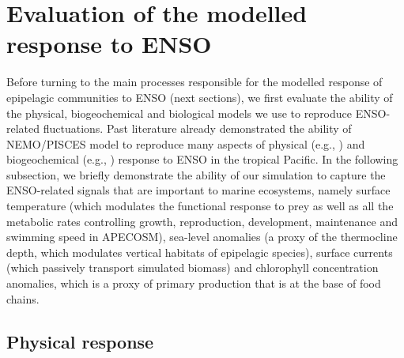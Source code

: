 \section{Evaluation of the modelled response to ENSO}
\label{sec:model-val}

Before turning to the main processes responsible for the modelled response of epipelagic communities to ENSO (next sections), we first evaluate the ability of the physical, biogeochemical and biological models we use to reproduce ENSO-related fluctuations. Past literature already demonstrated the ability of NEMO/PISCES model to reproduce many aspects of physical (e.g., \citealt{vialardModelStudyOceanic2001, lengaigneMechanismsControllingWarm2012, drushkaProcessesDrivingIntraseasonal2015, puyModulationEquatorialPacific2019}) and biogeochemical (e.g., \citealt{ masottiLargescaleShiftsPhytoplankton2011,gorguesRevisitingNina19982010, martinezReconstructingGlobalChlorophylla2020}) response to ENSO in the tropical Pacific. In the following subsection, we briefly demonstrate the ability of our simulation to capture the ENSO-related signals that are important to marine ecosystems, namely surface temperature (which modulates the functional response to prey as well as all the metabolic rates controlling growth, reproduction, development, maintenance and swimming speed in APECOSM), sea-level anomalies (a proxy of the thermocline depth, which modulates vertical habitats of epipelagic species), surface currents (which passively transport simulated biomass) and chlorophyll concentration anomalies, which is a proxy of primary production that is at the base of food chains.

\subsection{Physical response}

